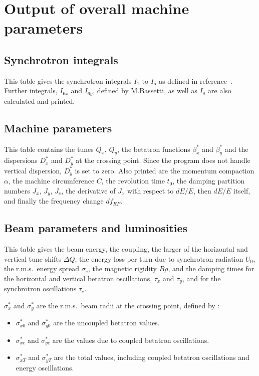 \section{Output of overall machine parameters}
\subsection{Synchrotron integrals}
This table gives the synchrotron integrals \(I_1\) to \(I_5\) as defined
in reference~\cite{B-HLMS}. Further integrals, \(I_{6x}\) and \(I_{6y}\),
defined by M.Bassetti,
as well as \(I_8\) are also calculated and printed.
 
\subsection{Machine parameters}
This table contains the tunes \(Q_x\), \(Q_y\), the betatron functions
\(\beta_x^*\) and \(\beta_y^*\) and the dispersions \(D_x^*\) and
\(D_y^*\) at the crossing point. Since the program does not handle
vertical dispersion, \(D_y^*\) is set to zero. Also printed are the
momentum compaction \(\alpha\), the machine circumference \(C\), the
revolution time \(t_0\), the damping partition numbers \(J_x\), \(J_y\),
\(J_e\), the derivative of \(J_x\) with respect to \(dE/E\), then \(dE/E\)
itself, and finally the frequency change \(df_{RF}\).
 
\subsection{Beam parameters and luminosities}\label{bbsec}
This table gives the beam energy, the coupling, the
larger of the horizontal and vertical tune shifts \(\Delta Q\), the
energy loss per turn due to synchrotron radiation \(U_0\), the r.m.s.\
energy spread \(\sigma_e\), the magnetic rigidity \(B\rho\), and the
damping times for the horizontal and vertical betatron oscillations,
\(\tau_x\) and \(\tau_y\), and for the synchrotron oscillations \(\tau_e\).
 
\(\sigma_x^*\) and \(\sigma_y^*\) are
the r.m.s.\ beam radii at the crossing
point, defined by :
 
\begin{itemize}
 
\item \rm \(\sigma_{x0}^*\) and \(\sigma_{y0}^*\)  are the uncoupled
betatron values.
 
\item \rm\(\sigma_{xc}^*\) and \(\sigma_{yc}^*\)   are the values due to
coupled betatron oscillations.
 
\item \rm \(\sigma_{xT}^*\) and \(\sigma_{yT}^*\)  are the total values,
including coupled betatron oscillations and energy oscillations.
 
\end{itemize}
 
